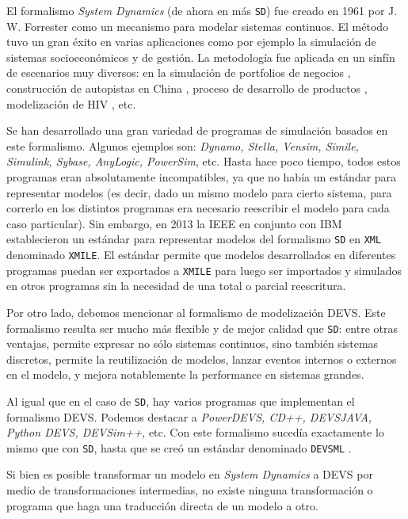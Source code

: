 
El formalismo \textit{System Dynamics} (de ahora en más \texttt{SD}) fue creado en 1961 por J. W.
Forrester como un mecanismo para modelar sistemas continuos. El método tuvo un
gran éxito en varias aplicaciones como por ejemplo la simulación de sistemas
socioeconómicos y de gestión. La metodología fue aplicada en un sinfín de
escenarios muy diversos: en la simulación de portfolios de negocios \cite{merten1987}, construcción de autopistas en China \cite{xu}, proceso de desarrollo de productos\cite{ford1998} ,
modelización de HIV \cite{sterman2001}, etc.


Se han desarrollado una gran variedad de programas de simulación basados en este formalismo. Algunos ejemplos son: \textit{Dynamo, Stella, Vensim, Simile, Simulink, Sybase, AnyLogic, PowerSim}, etc. Hasta hace poco tiempo, todos estos programas eran absolutamente incompatibles, ya que no había un estándar para representar modelos (es decir, dado un mismo modelo para cierto sistema, para correrlo en los distintos programas era necesario reescribir el modelo para cada caso particular). Sin embargo, en 2013 la IEEE en conjunto con IBM establecieron un estándar para representar modelos del formalismo \texttt{SD} en \texttt{XML} denominado \texttt{XMILE}\cite{xmile}. El estándar permite que modelos desarrollados en diferentes programas puedan ser exportados a \texttt{XMILE} para luego ser importados y simulados en otros programas sin la necesidad de una total o parcial reescritura.

Por otro lado, debemos mencionar al formalismo de modelización DEVS\cite{devs76}. Este formalismo resulta ser mucho más flexible y de mejor calidad que \texttt{SD}: entre otras ventajas, permite expresar no sólo sistemas continuos, sino también sistemas discretos, permite la reutilización de modelos, lanzar eventos internos o externos en el modelo, y mejora notablemente la performance en sistemas grandes.

Al igual que en el caso de \texttt{SD}, hay varios programas que implementan el formalismo DEVS. Podemos destacar a \textit{PowerDEVS, CD++, DEVSJAVA, Python DEVS,  DEVSim++}, etc. Con este formalismo sucedía exactamente lo mismo que con \texttt{SD}, hasta que se creó un estándar denominado \texttt{DEVSML} \cite{devsml}.

Si bien es posible transformar un modelo en \textit{System Dynamics} a DEVS por medio de transformaciones intermedias, no existe ninguna transformación o programa que haga una traducción directa de un modelo a otro. 

